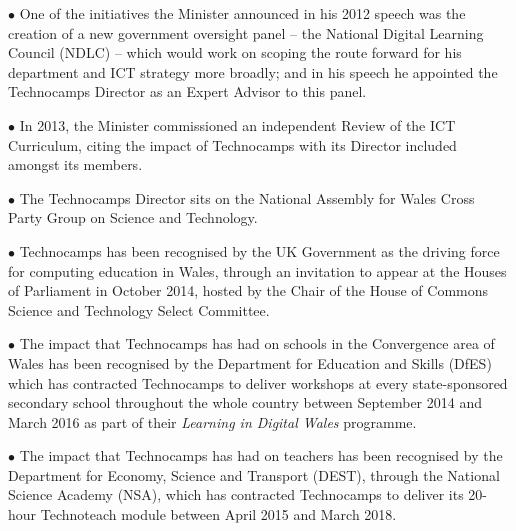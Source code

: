 \documentclass{sig-alternate}
\begin{document}
\noindent \textbf{$\bullet$}
One of the initiatives the Minister announced in his 2012 speech was
the creation of a new government oversight panel -- the National
Digital Learning Council
(NDLC) %
-- which would work on scoping the route forward for his department
and ICT strategy more broadly;
and in his speech he appointed
the Technocamps Director as an Expert Advisor
to this panel.
\vspace{1ex}

\noindent \textbf{$\bullet$}
In 2013, the Minister commissioned an independent Review of the ICT
Curriculum, citing the impact of Technocamps with its Director
included amongst its members.
\vspace{1ex}

\noindent \textbf{$\bullet$}
The Technocamps Director sits on
the National Assembly for Wales Cross Party Group on Science and Technology.
\vspace{1ex}

\noindent \textbf{$\bullet$}
Technocamps has been recognised by the UK Government as the driving
force for computing education in Wales, through an invitation to
appear at the Houses of Parliament in October 2014, hosted by the
Chair of the House of Commons Science and Technology Select Committee.
\vspace{1ex}

\noindent \textbf{$\bullet$}
The impact that Technocamps has had on schools in the Convergence area
of Wales has been recognised by the Department for Education and Skills (DfES)
which has contracted Technocamps to deliver workshops at every
state-sponsored secondary school throughout the whole country between
September 2014 and March 2016 as part of their \emph{Learning in
Digital Wales} programme.
\vspace{1ex}

\noindent \textbf{$\bullet$}
The impact that Technocamps has had on teachers has been recognised by
the Department for Economy, Science and Transport (DEST), through the
National Science Academy (NSA), which has contracted Technocamps to deliver
its 20-hour Technoteach module between April 2015 and March 2018.
\vspace{1ex}
\end{document}
